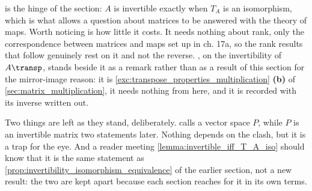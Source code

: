 \begin{ainote}
 is the hinge of the section: $A$ is
invertible exactly when $T_A$ is an isomorphism, which is what allows a question
about matrices to be answered with the theory of maps. Worth noticing is how
little it costs. It needs nothing about rank, only the correspondence between
matrices and maps set up in ch. 17a, so the rank results that follow genuinely
rest on it and not the reverse. , on the
invertibility of $A\transp$, stands beside it as a remark rather than as a
result of this section for the mirror-image reason: it is
\cref{exc:transpose_properties_multiplication} \textbf{(b)} of
\cref{sec:matrix_multiplication}, it needs nothing from here, and it is recorded
with its inverse written out.

Two things are left as they stand, deliberately.
 calls a vector space $P$, while $P$ is
an invertible matrix two statements later. Nothing depends on the clash, but it
is a trap for the eye. And a reader meeting
\cref{lemma:invertible_iff_T_A_iso} should know that it is the same statement as
\cref{prop:invertibility_isomorphism_equivalence} of the earlier section, not a
new result: the two are kept apart because each section reaches for it in its
own terms.
\end{ainote}
